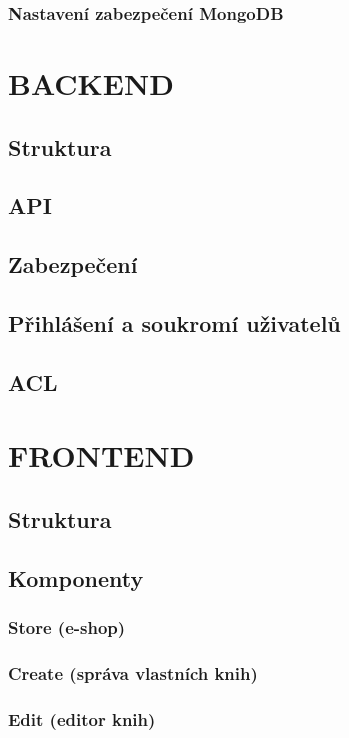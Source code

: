 \documentclass[a4paper,12pt,twoside,BCOR=10mm]{article}
\newcommand{\upc}[1]{\uppercase{#1}} %
\begin{document}
\subsubsection{Nastavení zabezpečení MongoDB}
  
\section{\upc{Backend}}\label{sec:backend}
\subsection{Struktura}
\subsection{API}
\subsection{Zabezpečení}
\subsection{Přihlášení a soukromí uživatelů}
\subsection{ACL}

\section{\upc{Frontend}}\label{sec:frontend}
\subsection{Struktura}
\subsection{Komponenty}

\subsubsection{Store (e-shop)}\label{sec:store}
\subsubsection{Create (správa vlastních knih)}\label{sec:create}
\subsubsection{Edit (editor knih)}\label{sec:edit}
\end{document}
